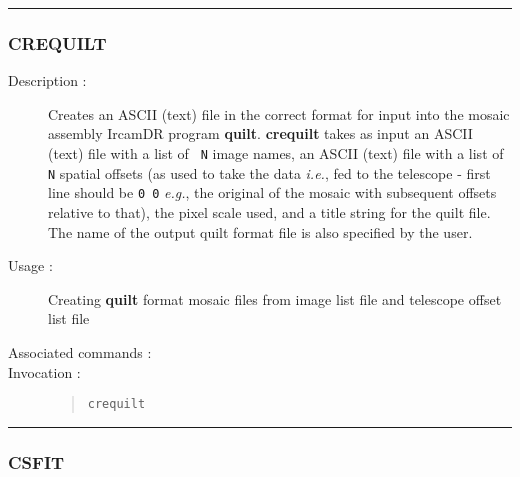 \hrule 
\subsubsection*{\label{CREQUILT}CREQUILT}

\begin{description}

\item[Description :] Creates an ASCII (text) file in the correct format
for input into the mosaic assembly {\sc IrcamDR} program {\bf quilt}.
{\bf crequilt} takes as input an ASCII (text) file with a list of {\tt
N} image names, an ASCII (text) file with a list of {\tt N} spatial
offsets (as used to take the data \emph{i.e.}, fed to the telescope -
first line should be {\tt 0 0} \emph{e.g.}, the original of the mosaic
with subsequent offsets relative to that), the pixel scale used, and a
title string for the quilt file.  The name of the output quilt format
file is also specified by the user.

\item[Usage :] Creating {\bf quilt} format mosaic files from image list
file and telescope offset list file

\item[Associated commands :] {\tt {}}

\item[Invocation :]

\begin{quote}{\tt  crequilt }\end{quote}

\end{description}

\hrule 
\subsubsection*{\label{CSFIT}CSFIT}

